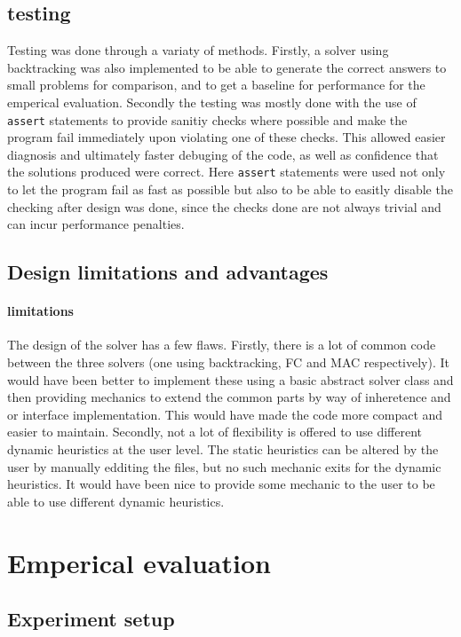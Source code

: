 \documentclass[british]{article}
\newcommand{\code}[1]{\texttt{#1}}
\begin{document}
\subsection{testing}
Testing was done through a variaty of methods. Firstly, a solver using backtracking was also implemented to be able to generate the correct answers to small problems for comparison, and to get a baseline for performance for the emperical evaluation. Secondly the testing was mostly done with the use of \code{assert} statements to provide sanitiy checks where possible and make the program fail immediately upon violating one of these checks. This allowed easier diagnosis and ultimately faster debuging of the code, as well as confidence that the solutions produced were correct. Here \code{assert} statements were used not only to let the program fail as fast as possible but also to be able to easitly disable the checking after design was done, since the checks done are not always trivial and can incur performance penalties. 

\subsection{Design limitations and advantages} 
\paragraph{limitations}The design of the solver has a few flaws. Firstly, there is a lot of common code between the three solvers (one using backtracking, FC and MAC respectively). It would have been better to implement these using a basic abstract solver class and then providing mechanics to extend the common parts by way of inheretence and or interface implementation. This would have made the code more compact and easier to maintain. Secondly, not a lot of flexibility is offered to use different dynamic heuristics at the user level. The static heuristics can be altered by the user by manually edditing the files, but no such mechanic exits for the dynamic heuristics. It would have been nice to provide some mechanic to the user to be able to use different dynamic heuristics. 


\section{Emperical evaluation}

\subsection{Experiment setup}
\end{document}
